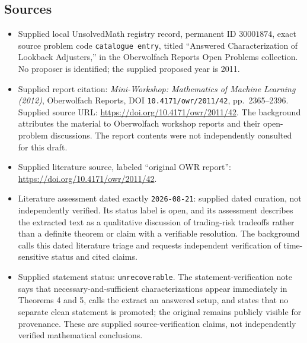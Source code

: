 \documentclass[11pt]{article}
\begin{document}
\subsection{Sources}
\begin{itemize}
\item Supplied local UnsolvedMath registry record, permanent ID \(30001874\), exact source problem code \texttt{catalogue entry}, titled ``Answered Characterization of Lookback Adjusters,'' in the Oberwolfach Reports Open Problems collection. No proposer is identified; the supplied proposed year is 2011.
\item Supplied report citation: \emph{Mini-Workshop: Mathematics of Machine Learning (2012)}, Oberwolfach Reports, DOI \texttt{10.4171/owr/2011/42}, pp.\ 2365--2396. Supplied source URL: \url{https://doi.org/10.4171/owr/2011/42}. The background attributes the material to Oberwolfach workshop reports and their open-problem discussions. The report contents were not independently consulted for this draft.
\item Supplied literature source, labeled ``original OWR report'': \url{https://doi.org/10.4171/owr/2011/42}.
\item Literature assessment dated exactly \texttt{2026-08-21}: supplied dated curation, not independently verified. Its status label is open, and its assessment describes the extracted text as a qualitative discussion of trading-risk tradeoffs rather than a definite theorem or claim with a verifiable resolution. The background calls this dated literature triage and requests independent verification of time-sensitive status and cited claims.
\item Supplied statement status: \texttt{unrecoverable}. The statement-verification note says that necessary-and-sufficient characterizations appear immediately in Theorems 4 and 5, calls the extract an answered setup, and states that no separate clean statement is promoted; the original remains publicly visible for provenance. These are supplied source-verification claims, not independently verified mathematical conclusions.
\end{itemize}
\end{document}
